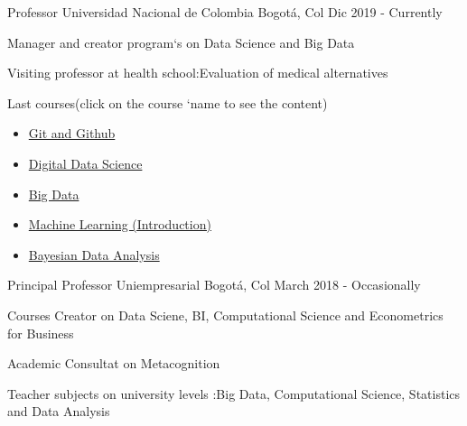 

\begin{cventries}

\cventry
    {Professor}
    {Universidad Nacional de Colombia}
    {Bogotá, Col}
    {Dic 2019 - Currently}
    {
    \begin{cvitems}
    \item {Manager and creator program`s on Data Science and Big Data}
    \item {Visiting professor at health school:Evaluation of medical alternatives}
    \item {Last courses(click on the course `name  to see the content)}
    \begin{itemize}
        \item {\textcolor{brown}{\href{https://github.com/carlosjimenez88M/Github-Class/tree/master}{Git and Github}}}
        \item {\textcolor{brown}{\href{https://github.com/carlosjimenez88M/Marketing_Digital}{Digital Data Science}}}
        \item {\textcolor{brown}{\href{https://github.com/carlosjimenez88M/Curso-de-Big-Data-e-Ingenieria-de-datos}{Big Data}}}
        \item {\textcolor{brown}{\href{https://github.com/carlosjimenez88M/Machine_Learning}{Machine Learning (Introduction)}}}
        \item {\textcolor{brown}{\href{https://github.com/carlosjimenez88M/Curso-de-Big-Data-e-Ingenieria-de-datos}{Bayesian Data Analysis}}}
    \end{itemize}
    \end{cvitems}
    }
 




  \cventry
    {Principal Professor } %
    {Uniempresarial} %
    {Bogotá, Col} %
    {March 2018 - Occasionally} %
    {
      \begin{cvitems} %
        \item {Courses Creator on Data Sciene, BI, Computational Science and Econometrics for Business}
        \item {Academic Consultat on Metacognition }
        \item {Teacher  subjects on university levels :Big Data, Computational Science, Statistics and Data Analysis}
      \end{cvitems}
    }


\end{cventries}
